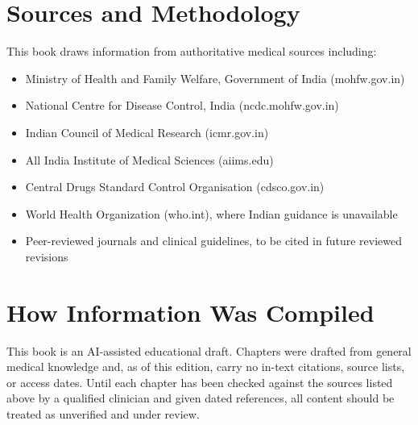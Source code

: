 \documentclass[12pt,oneside]{book}
\begin{document}



























\appendix

\section*{Sources and Methodology}
This book draws information from authoritative medical sources including:
\begin{itemize}
  \item Ministry of Health and Family Welfare, Government of India (mohfw.gov.in)
  \item National Centre for Disease Control, India (ncdc.mohfw.gov.in)
  \item Indian Council of Medical Research (icmr.gov.in)
  \item All India Institute of Medical Sciences (aiims.edu)
  \item Central Drugs Standard Control Organisation (cdsco.gov.in)
  \item World Health Organization (who.int), where Indian guidance is unavailable
  \item Peer-reviewed journals and clinical guidelines, to be cited in future reviewed revisions
\end{itemize}

\section*{How Information Was Compiled}
This book is an AI-assisted educational draft. Chapters were drafted from general medical knowledge and, as of this edition, carry no in-text citations, source lists, or access dates. Until each chapter has been checked against the sources listed above by a qualified clinician and given dated references, all content should be treated as unverified and under review.
\end{document}
